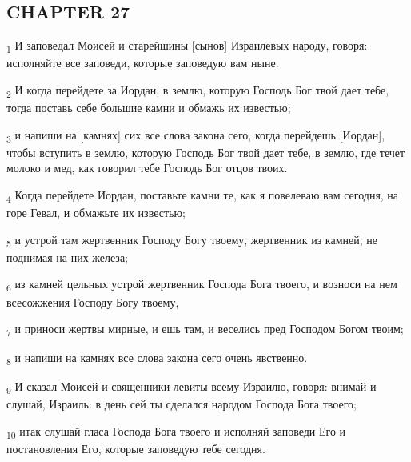 \subsection{CHAPTER 27}
\begin{tcolorbox}
\textsubscript{1} И заповедал Моисей и старейшины [сынов] Израилевых народу, говоря: исполняйте все заповеди, которые заповедую вам ныне.
\end{tcolorbox}
\begin{tcolorbox}
\textsubscript{2} И когда перейдете за Иордан, в землю, которую Господь Бог твой дает тебе, тогда поставь себе большие камни и обмажь их известью;
\end{tcolorbox}
\begin{tcolorbox}
\textsubscript{3} и напиши на [камнях] сих все слова закона сего, когда перейдешь [Иордан], чтобы вступить в землю, которую Господь Бог твой дает тебе, в землю, где течет молоко и мед, как говорил тебе Господь Бог отцов твоих.
\end{tcolorbox}
\begin{tcolorbox}
\textsubscript{4} Когда перейдете Иордан, поставьте камни те, как я повелеваю вам сегодня, на горе Гевал, и обмажьте их известью;
\end{tcolorbox}
\begin{tcolorbox}
\textsubscript{5} и устрой там жертвенник Господу Богу твоему, жертвенник из камней, не поднимая на них железа;
\end{tcolorbox}
\begin{tcolorbox}
\textsubscript{6} из камней цельных устрой жертвенник Господа Бога твоего, и возноси на нем всесожжения Господу Богу твоему,
\end{tcolorbox}
\begin{tcolorbox}
\textsubscript{7} и приноси жертвы мирные, и ешь там, и веселись пред Господом Богом твоим;
\end{tcolorbox}
\begin{tcolorbox}
\textsubscript{8} и напиши на камнях все слова закона сего очень явственно.
\end{tcolorbox}
\begin{tcolorbox}
\textsubscript{9} И сказал Моисей и священники левиты всему Израилю, говоря: внимай и слушай, Израиль: в день сей ты сделался народом Господа Бога твоего;
\end{tcolorbox}
\begin{tcolorbox}
\textsubscript{10} итак слушай гласа Господа Бога твоего и исполняй заповеди Его и постановления Его, которые заповедую тебе сегодня.
\end{tcolorbox}
